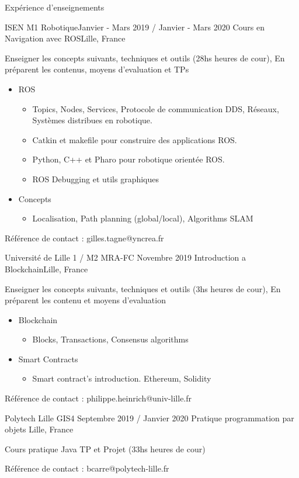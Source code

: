 \documentclass{resume} %
\begin{document}
\begin{rSection}{Exp\'{e}rience d'enseignements}

\begin{rSubsection}{ISEN M1 Robotique}{Janvier - Mars 2019 / Janvier - Mars 2020  }{Cours en Navigation avec ROS}{Lille, France}
\item Enseigner les concepts suivants, techniques et outils (28hs heures de cour), En préparent les contenus, moyens d'evaluation et TPs 
\begin{itemize}
	\item ROS
	\begin{itemize}
		\item Topics, Nodes, Services, Protocole de communication DDS,  Réseaux, Systèmes distribues en robotique.
		\item Catkin et makefile pour construire des applications ROS.
		\item Python, C++ et Pharo pour robotique orientée ROS.
		\item ROS Debugging et utils graphiques
	\end{itemize}
	\item Concepts 
	\begin{itemize}
		\item Localisation, Path planning (global/local), Algorithms SLAM
	\end{itemize}
\end{itemize}
\item R\'{e}f\'{e}rence de contact : gilles.tagne@yncrea.fr
\end{rSubsection}

\begin{rSubsection}{Université de Lille 1 / M2 MRA-FC }{Novembre 2019 }{Introduction a Blockchain}{Lille, France}
\item Enseigner les concepts suivants, techniques et outils (3hs heures de cour), En préparent les contenu et moyens d'evaluation

\begin{itemize}
	\item Blockchain
	\begin{itemize}
		\item Blocks, Transactions, Consensus algorithms
	\end{itemize}
	\item Smart Contracts
	\begin{itemize}
		\item Smart contract's introduction. Ethereum, Solidity 
	\end{itemize}
\end{itemize}
\item R\'{e}f\'{e}rence de contact : philippe.heinrich@univ-lille.fr
\end{rSubsection}
\begin{rSubsection}{Polytech Lille GIS4 }{Septembre  2019 / Janvier 2020 }{Pratique programmation par objets }{Lille, France}
\item Cours pratique Java TP et Projet (33hs heures de cour) 
\item R\'{e}f\'{e}rence de contact : bcarre@polytech-lille.fr 
\end{rSubsection}



\end{rSection}
\end{document}
